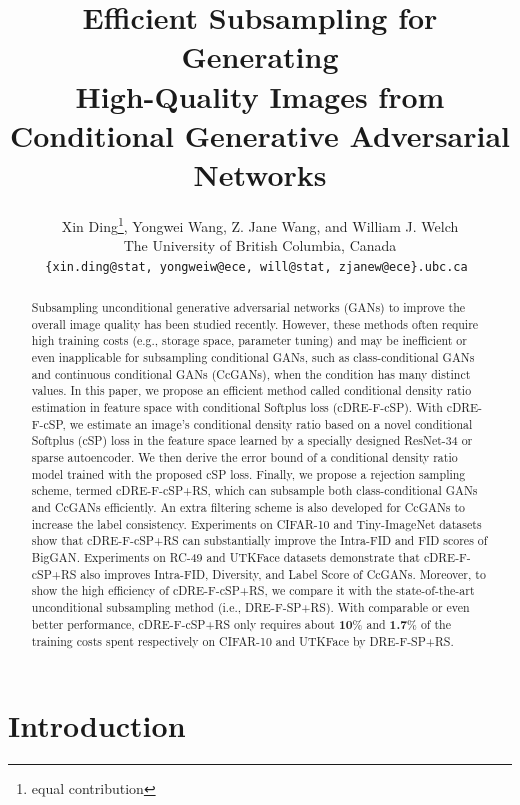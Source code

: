 \documentclass[10pt, twocolumn]{article}
\title{Efficient Subsampling for Generating \\ High-Quality Images from \\ Conditional Generative Adversarial Networks}
\author{
 	Xin Ding\thanks{equal contribution}, \hspace*{0.05cm} Yongwei Wang\footnotemark[1], \hspace*{0.05cm} Z. Jane Wang, and William J. Welch \\
 	The University of British Columbia, Canada\\
 	\texttt{\small \{xin.ding@stat, yongweiw@ece, will@stat, zjanew@ece\}.ubc.ca}\
 }
\theoremstyle{definition}
\begin{document}
\maketitle
\begin{abstract}
  Subsampling unconditional generative adversarial networks (GANs) to improve the overall image quality has been studied recently. However, these methods often require high training costs (e.g., storage space, parameter tuning) and may be inefficient or even inapplicable for subsampling conditional GANs, such as class-conditional GANs and continuous conditional GANs (CcGANs), when the condition has many distinct values.     In this paper, we propose an efficient method called conditional density ratio estimation in feature space with conditional Softplus loss (cDRE-F-cSP). With cDRE-F-cSP, we estimate an image's conditional density ratio based on a novel conditional Softplus (cSP) loss in the feature space learned by a specially designed ResNet-34 or sparse autoencoder. We then derive the error bound of a conditional density ratio model trained with the proposed cSP loss. Finally, we propose a rejection sampling scheme, termed cDRE-F-cSP+RS, which can subsample both class-conditional GANs and CcGANs efficiently. An extra filtering scheme is also developed for CcGANs to increase the label consistency. Experiments on CIFAR-10 and Tiny-ImageNet datasets show that cDRE-F-cSP+RS can substantially improve the Intra-FID and FID scores of BigGAN. Experiments on RC-49 and UTKFace datasets demonstrate that cDRE-F-cSP+RS also improves Intra-FID, Diversity, and Label Score of CcGANs. Moreover, to show the high efficiency of cDRE-F-cSP+RS, we compare it with the state-of-the-art unconditional subsampling method (i.e., DRE-F-SP+RS). With comparable or even better performance, cDRE-F-cSP+RS only requires about \textbf{10}\% and \textbf{1.7}\% of the training costs spent respectively on CIFAR-10 and UTKFace by DRE-F-SP+RS.
\end{abstract}



\section{Introduction}\label{sec:intro}
\end{document}
